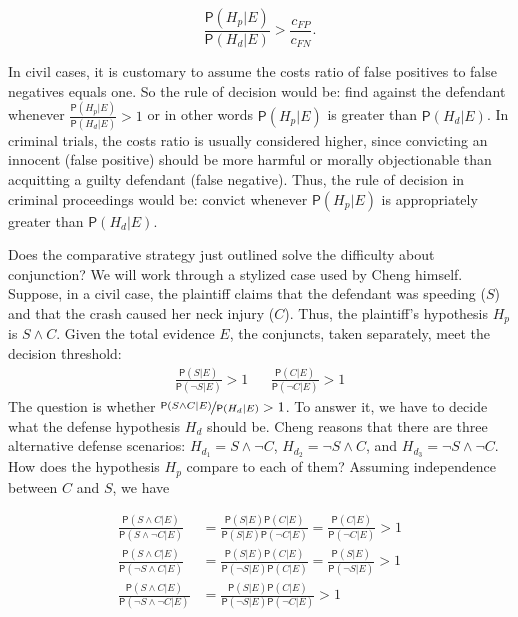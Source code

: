 \documentclass[
  10pt,
  dvipsnames,enabledeprecatedfontcommands]{scrartcl}
\newcommand{\n}{\neg}
\newcommand{\et}{\wedge}
\newcommand{\pr}[1]{\mathsf{P}(#1)}
\begin{document}
\[\frac{\pr{H_p \vert E}}{\pr{H_d \vert E}} > \frac{c_{FP}}{c_{FN}}.\]

\noindent In civil cases, it is customary to assume the costs ratio of
false positives to false negatives equals one. So the rule of decision
would be: find against the defendant whenever
\(\frac{\pr{H_p \vert E}}{\pr{H_d \vert E}} > 1\) or in other words
\(\pr{H_p \vert E}\) is greater than \(\pr{H_d \vert E}\). In criminal
trials, the costs ratio is usually considered higher, since convicting
an innocent (false positive) should be more harmful or morally
objectionable than acquitting a guilty defendant (false negative). Thus,
the rule of decision in criminal proceedings would be: convict whenever
\(\pr{H_p \vert E}\) is appropriately greater than \(\pr{H_d \vert E}\).

Does the comparative strategy just outlined solve the difficulty about
conjunction? We will work through a stylized case used by Cheng himself.
Suppose, in a civil case, the plaintiff claims that the defendant was
speeding (\(S\)) and that the crash caused her neck injury (\(C\)).
Thus, the plaintiff's hypothesis \(H_p\) is \(S\et C\). Given the total
evidence \(E\), the conjuncts, taken separately, meet the decision
threshold: \begin{align}
 \nonumber 
 \frac{\pr{S\vert E}}{\pr{\neg S \vert E}} > 1   & & \frac{\pr{C\vert E}}{\pr{\neg C \vert E}} > 1
\end{align} \noindent The question is whether
\(\nicefrac{\pr{S\et C\vert E}}{\pr{H_d \vert E}}>1\). To answer it, we
have to decide what the defense hypothesis \(H_d\) should be. Cheng
reasons that there are three alternative defense scenarios:
\(H_{d_1}= S\et \n C\), \(H_{d_2}=\n S \et C\), and
\(H_{d_3}=\n S \et \n C\). How does the hypothesis \(H_p\) compare to
each of them? Assuming independence between \(C\) and \(S\), we have

\begin{align}\label{eq:cheng-multiplication}
\frac{\pr{S\et C\vert E}}{\pr{S\et \n C\vert E}} & = \frac{\pr{S\vert E}\pr{C\vert E}}{\pr{S \vert E}\pr{\n C \vert E}}  =\frac{\pr{C\vert E}}{\pr{\n C \vert E}} > 1 \\
\nonumber
\frac{\pr{S\et C\vert E}}{\pr{\n S\et C\vert E}} & = \frac{\pr{S\vert E}\pr{C\vert E}}{\pr{\n S \vert E}\pr{C\vert E}}  = \frac{\pr{S\vert E}}{\pr{\n S \vert E}} > 1 \\
\nonumber
\frac{\pr{S\et C\vert E}}{\pr{\n S\et \n C\vert E}} & = \frac{\pr{S\vert E}\pr{C\vert E}}{\pr{\n S \vert E}\pr{\n C \vert E}}   > 1 
\end{align}
\end{document}
